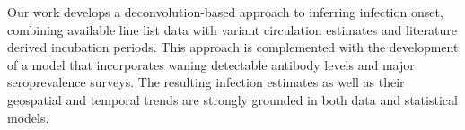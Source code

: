 % 

Our work develops a deconvolution-based approach to inferring infection onset,
combining available line list data with variant circulation estimates and
literature derived incubation periods.
 This approach is complemented with the development of a model that incorporates
 waning detectable antibody levels and major seroprevalence surveys.
The resulting infection estimates as well as their geospatial and temporal
trends are strongly grounded in both data and statistical models.

